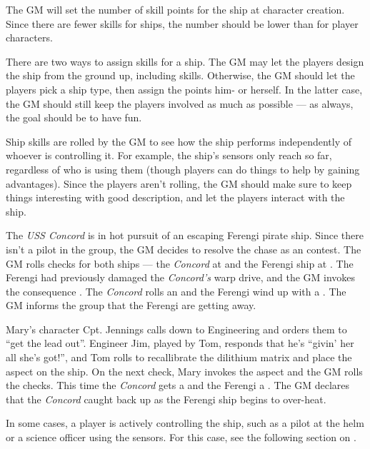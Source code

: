 \documentclass[12pt,titlepage,openany]{book}
\begin{document}
The GM will set the number of skill points for the ship at character creation.
Since there are fewer skills for ships, the number should be lower than for
player characters.

There are two ways to assign skills for a ship. The GM may let the players
design the ship from the ground up, including skills. Otherwise, the GM should
let the players pick a ship type, then assign the points him- or herself. In
the latter case, the GM should still keep the players involved as much as
possible --- as always, the goal should be to have fun.

Ship skills are rolled by the GM to see how the ship performs independently of
whoever is controlling it. For example, the ship's sensors only reach so far,
regardless of who is using them (though players can do things to help by
gaining advantages). Since the players aren't rolling, the GM should make sure
to keep things interesting with good description, and let the players interact
with the ship.

\begin{example}
    The \emph{USS Concord} is in hot pursuit of an escaping Ferengi pirate
    ship. Since there isn't a pilot in the group, the GM decides to resolve the
    chase as an  contest. The GM rolls  checks
    for both ships --- the \emph{Concord} at  and the Ferengi ship
    at . The Ferengi had previously damaged the \emph{Concord's}
    warp drive, and the GM invokes the consequence . The \emph{Concord} rolls an  and the Ferengi wind up
    with a . The GM informs the group that the Ferengi are getting
    away.

    Mary's character Cpt. Jennings calls down to Engineering and orders them to
    ``get the lead out''. Engineer Jim, played by Tom, responds that he's
    ``givin' her all she's got!'', and Tom rolls  to
    recallibrate the dilithium matrix and place the aspect  on the ship. On the next  check, Mary invokes the
    aspect and the GM rolls the checks. This time the \emph{Concord} gets a
     and the Ferengi a . The GM declares that the
    \emph{Concord} caught back up as the Ferengi ship begins to over-heat.
\end{example}

In some cases, a player is actively controlling the ship, such as a pilot at
the helm or a science officer using the sensors. For this case, see the
following section on .
\end{document}
